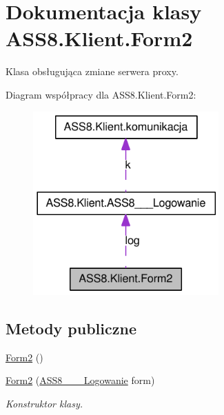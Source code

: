 \hypertarget{a00004}{
\section{Dokumentacja klasy ASS8.Klient.Form2}
\label{d0/d0b/a00004}
}
Klasa obsługująca zmiane serwera proxy.  


Diagram współpracy dla ASS8.Klient.Form2:\nopagebreak
\begin{figure}[H]
\begin{center}
\leavevmode
\includegraphics[width=202pt]{dd/dae/a00163}
\end{center}
\end{figure}
\subsection*{Metody publiczne}
\begin{CompactItemize}
\item 
\hyperlink{a00004_ae4349aa452f0c374938f4ad57b3fb04}{Form2} ()
\item 
\hyperlink{a00004_329107a1724971156a30d347492950dd}{Form2} (\hyperlink{a00001}{ASS8\_\-\_\-\_\-Logowanie} form)
\begin{CompactList}\small\item\em Konstruktor klasy. \item\end{CompactList}\end{CompactItemize}
